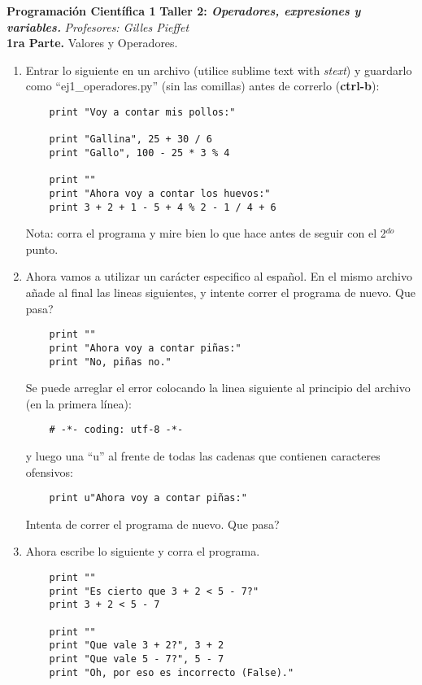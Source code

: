 \documentclass[10pt, twocolumn]{article}
\begin{document}
\noindent
{\Large \bf Programación Científica 1}
\vskip 0.3cm
\noindent
{\large \bf Taller 2: {\it Operadores, expresiones y variables.}}
\vskip 0.2cm
\noindent
{\it Profesores:  Gilles Pieffet}\\


{\bf 1ra Parte.} Valores y Operadores.
\begin{enumerate}

\item Entrar lo siguiente en un archivo (utilice sublime text with \emph{stext}) y guardarlo como ``ej1\_operadores.py'' (sin las comillas) antes de correrlo (\textbf{ctrl-b}):
\begin{verbatim}
	print "Voy a contar mis pollos:"
	
	print "Gallina", 25 + 30 / 6
	print "Gallo", 100 - 25 * 3 % 4
	
	print ""
	print "Ahora voy a contar los huevos:"
	print 3 + 2 + 1 - 5 + 4 % 2 - 1 / 4 + 6
\end{verbatim}
Nota: corra el programa y mire bien lo que hace antes de seguir con el 2$^{do}$ punto.

\item Ahora vamos a utilizar un carácter especifico al español. En el mismo archivo añade al final las lineas siguientes, y intente correr el programa de nuevo. Que pasa?
\begin{verbatim}
	print ""
	print "Ahora voy a contar piñas:"
	print "No, piñas no."
\end{verbatim}

Se puede arreglar el error colocando la linea siguiente al principio del archivo (en la  primera línea):
\begin{verbatim}
	# -*- coding: utf-8 -*-
\end{verbatim}
y luego una ``u'' al frente de todas las cadenas que contienen caracteres ofensivos:
\begin{verbatim}
	print u"Ahora voy a contar piñas:"
\end{verbatim}
Intenta de correr el programa de nuevo. Que pasa?

\item Ahora escribe lo siguiente y corra el programa.
\begin{verbatim}
	print ""
	print "Es cierto que 3 + 2 < 5 - 7?"
	print 3 + 2 < 5 - 7

	print ""
	print "Que vale 3 + 2?", 3 + 2
	print "Que vale 5 - 7?", 5 - 7
	print "Oh, por eso es incorrecto (False)."


\end{verbatim}
\end{enumerate}
\end{document}
